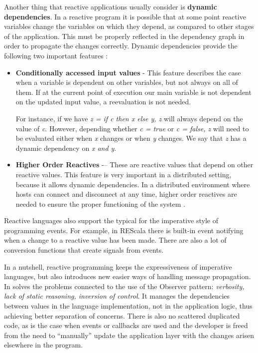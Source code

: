 \documentclass{sigplanconf}
\begin{document}
Another thing that reactive applications usually consider is \textbf{dynamic dependencies}. In a reactive program it is possible that at some point reactive variables change the variables on which they depend, as compared to other stages of the application. This must be properly reflected in the dependency graph in order to propagate the changes correctly. Dynamic dependencies provide the following two important features \cite{sidup}:

\begin{itemize} 
\item\textbf{Conditionally accessed input values} - This feature describes the case when a variable is dependent on other variables, but not always on all of them. If at the current point of execution our main variable is not dependent on the updated input value, a reevaluation is not needed.

For instance, if we have \textit{z = if c then x else y, z} will always depend on the value of \textit{c}. However, depending whether \textit{c = true} or \textit{c = false, z} will need to be evaluated either when \textit{x} changes or when \textit{y} changes. We say that \textit{z} has a dynamic dependency on \textit{x and y}.

\item\textbf{Higher Order Reactives} -– These are reactive values that depend on other reactive values. This feature is very important in a distributed setting, because it allows dynamic dependencies. In a distributed environment where hosts can connect and disconnect at any time, higher order reactives are needed to ensure the proper functioning of the system \cite{sidup}.

\end{itemize}

Reactive languages also support the typical for the imperative style of programming events. For example, in REScala \cite{rescala} there is built-in event notifying when a change to a reactive value has been made. There are also a lot of conversion functions that create signals from events.

In a nutshell, reactive programming keeps the expressiveness of imperative languages, but also introduces new easier ways of handling message propagation. In solves the problems connected to the use of the Observer pattern: \textit{verbosity, lack of static reasoning, inversion of control}. It manages the dependencies between values in the language implementation, not in the application logic, thus achieving better separation of concerns. There is also no scattered duplicated code, as is the case when events or callbacks are used and the developer is freed from the need to “manually” update the application layer with the changes arisen elsewhere in the program.
\end{document}
